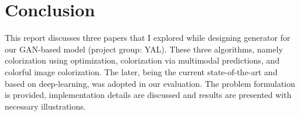 \documentclass[10pt]{article}
\begin{document}
\section{Conclusion}
This report discusses three papers that I explored while designing generator for our GAN-based model (project group: YAL). 
These three algorithms, namely colorization using optimization, colorization via multimodal predictions, and colorful image colorization. The later, being the current state-of-the-art and based on deep-learning, was adopted in our evaluation. The problem formulation is provided, implementation details are discussed and results are presented with necessary illustrations. 

\vspace{1mm}

\footnotesize

\end{document}

